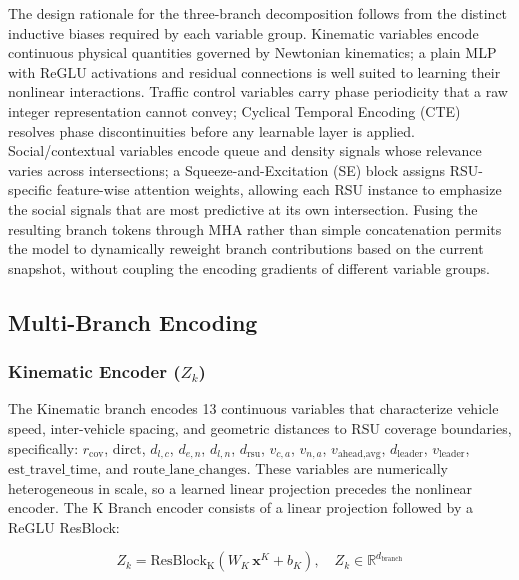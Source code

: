 \documentclass[journal]{IEEEtran}
\begin{document}
The design rationale for the three-branch decomposition follows from the distinct inductive biases required by each variable group.
Kinematic variables encode continuous physical quantities governed by Newtonian kinematics; a plain MLP with ReGLU activations and residual connections is well suited to learning their nonlinear interactions.
Traffic control variables carry phase periodicity that a raw integer representation cannot convey; Cyclical Temporal Encoding (CTE) resolves phase discontinuities before any learnable layer is applied.
Social/contextual variables encode queue and density signals whose relevance varies across intersections; a Squeeze-and-Excitation (SE) block assigns RSU-specific feature-wise attention weights, allowing each RSU instance to emphasize the social signals that are most predictive at its own intersection.
Fusing the resulting branch tokens through MHA rather than simple concatenation permits the model to dynamically reweight branch contributions based on the current snapshot, without coupling the encoding gradients of different variable groups.

\subsection{Multi-Branch Encoding}
\label{sec.prop.B}

\subsubsection{Kinematic Encoder ($Z_k$)}

The Kinematic branch encodes 13 continuous variables that characterize vehicle speed, inter-vehicle spacing, and geometric distances to RSU coverage boundaries, specifically:
$r_\text{cov}$, $\text{dirct}$, $d_{l,c}$, $d_{e,n}$, $d_{l,n}$, $d_\text{rsu}$, $v_{c,a}$, $v_{n,a}$, $v_\text{ahead,avg}$, $d_\text{leader}$, $v_\text{leader}$, $\text{est\_travel\_time}$, and $\text{route\_lane\_changes}$.
These variables are numerically heterogeneous in scale, so a learned linear projection precedes the nonlinear encoder.
The K Branch encoder consists of a linear projection followed by a ReGLU ResBlock:

\begin{equation}
Z_k = \text{ResBlock}_\text{K}\!\left(W_K\, \mathbf{x}^K + b_K\right), \quad Z_k \in \mathbb{R}^{d_\text{branch}}
\label{eq:zk}
\end{equation}
\end{document}
